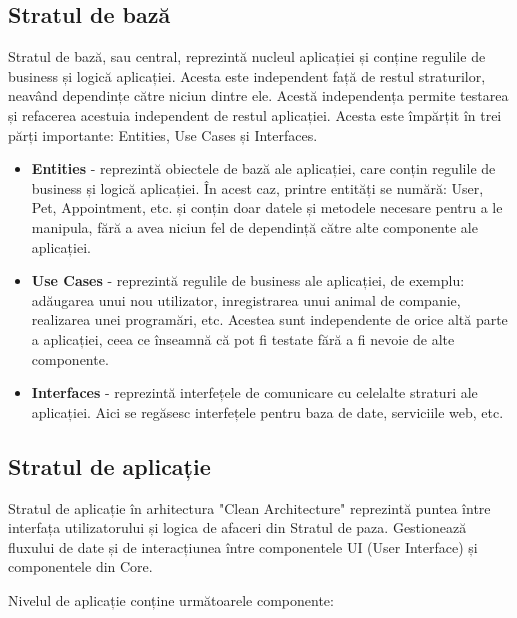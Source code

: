 \newpage

\subsection{Stratul de bază}

Stratul de bază, sau central, reprezintă nucleul aplicației și conține regulile de business și logică aplicației. Acesta este independent față de restul straturilor, neavând dependințe către niciun dintre ele. Acestă independența permite testarea și refacerea acestuia independent de restul aplicației. Acesta este împărțit în trei părți importante: Entities, Use Cases și Interfaces.

\begin{itemize}
    \item \textbf{Entities} - reprezintă obiectele de bază ale aplicației, care conțin regulile de business și logică aplicației. În acest caz, printre entități se numără: User, Pet, Appointment, etc. și conțin doar datele și metodele necesare pentru a le manipula, fără a avea niciun fel de dependință către alte componente ale aplicației.
    \item \textbf{Use Cases} - reprezintă regulile de business ale aplicației, de exemplu: adăugarea unui nou utilizator, inregistrarea unui animal de companie, realizarea unei programări, etc. Acestea sunt independente de orice altă parte a aplicației, ceea ce înseamnă că pot fi testate fără a fi nevoie de alte componente. 
    \item \textbf{Interfaces} - reprezintă interfețele de comunicare cu celelalte straturi ale aplicației. Aici se regăsesc interfețele pentru baza de date, serviciile web, etc.
    
\end{itemize}

\subsection{Stratul de aplicație}

Stratul de aplicație în arhitectura "Clean Architecture" reprezintă puntea între interfața utilizatorului și logica de afaceri din Stratul de paza. Gestionează fluxului de date și de interacțiunea între componentele UI (User Interface) și componentele din Core. 

Nivelul de aplicație conține următoarele componente: 

